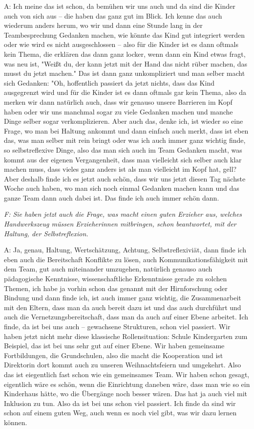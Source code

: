 A: Ich meine das ist schon, da bemühen wir uns auch und da sind die Kinder auch von sich aus -- die haben das ganz gut im Blick. Ich kenne das auch wiederum anders herum, wo wir und dann eine Stunde lang in der Teambesprechung Gedanken machen, wie könnte das Kind gut integriert werden oder wie wird es nicht ausgeschlossen -- also für die Kinder ist es dann oftmals kein Thema, die erklären das dann ganz locker, wenn dann ein Kind etwas fragt, was neu ist, "Weißt du, der kann jetzt mit der Hand das nicht rüber machen, das musst du jetzt machen." Das ist dann ganz unkompliziert und man selber macht sich Gedanken: "Oh, hoffentlich passiert da jetzt nichts, dass das Kind ausgegrenzt wird und für die Kinder ist es dann oftmals gar kein Thema, also da merken wir dann natürlich auch, dass wir genauso unsere Barrieren im Kopf haben oder wir uns manchmal sogar zu viele Gedanken machen und manche Dinge selber sogar verkomplizieren. Aber auch das, denke ich, ist wieder so eine Frage, wo man bei Haltung ankommt und dann einfach auch merkt, dass ist eben das, was man selber mit rein bringt oder was ich auch immer ganz wichtig finde, so selbstreflexive Dinge, also das man sich auch im Team Gedanken macht, was kommt aus der eigenen Vergangenheit, dass man vielleicht sich selber auch klar machen muss, dass vieles ganz anders ist als man vielleicht im Kopf hat, gell? Aber deshalb finde ich es jetzt auch schön, dass wir uns jetzt diesen Tag nächste Woche auch haben, wo man sich noch einmal Gedanken machen kann und das ganze Team dann auch dabei ist. Das finde ich auch immer schön dann.

\emph{F: Sie haben jetzt auch die Frage, was macht einen guten Erzieher aus, welches Handwerkszeug müssen Erzieherinnen mitbringen, schon beantwortet, mit der Haltung, der Selbstreflexion.}

A: Ja, genau, Haltung, Wertschätzung, Achtung, Selbstreflexiviät, dann finde ich eben auch die Bereitschaft Konflikte zu lösen, auch Kommunikationsfähigkeit mit dem Team, gut auch miteinander umzugehen, natürlich genauso auch pädagogische Kenntnisse, wissenschaftliche Erkenntnisse gerade zu solchen Themen, ich habe ja vorhin schon das genannt mit der Hirnforschung oder Bindung und dann finde ich, ist auch immer ganz wichtig, die Zusammenarbeit mit den Eltern, dass man da auch bereit dazu ist und das auch durchführt und auch die Vernetzungsbereitschaft, dass man da auch auf einer Ebene arbeitet. Ich finde, da ist bei uns auch -- gewachsene Strukturen, schon viel passiert. Wir haben jetzt nicht mehr diese klassische Rollensituation: Schule Kindergarten zum Beispiel, das ist bei uns sehr gut auf einer Ebene. Wir haben gemeinsame Fortbildungen, die Grundschulen, also die macht die Kooperation und ist Direktorin dort kommt auch zu unseren Weihnachtsfeiern und umgekehrt. Also das ist eiegentlich fast schon wie ein gemeinsames Team. Wir haben schon gesagt, eigentlich wäre es schön, wenn die Einrichtung daneben wäre, dass man wie so ein Kinderhaus hätte, wo die Übergänge noch besser wären. Das hat ja auch viel mit Inklusion zu tun. Also da ist bei uns schon viel passiert. Ich finde da sind wir schon auf einem guten Weg, auch wenn es noch viel gibt, was wir dazu lernen können. 

